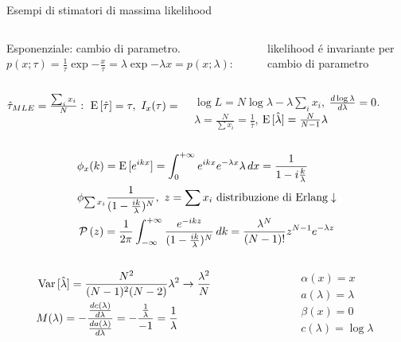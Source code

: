 \documentclass[asd-beamer.tex]{subfiles}
\begin{document}
\begin{frame}[allowframebreaks]{Esempi di stimatori di massima likelihood}
\begin{columns}[T]
\begin{column}{0.6\textwidth}
Esponenziale: cambio di parametro. $p(x;\tau)=\frac{1}{\tau}\exp{-\frac{x}{\tau}}=\lambda\exp{-\lambda x}=p(x;\lambda)$:
\end{column}
\begin{column}{0.4\textwidth}
likelihood \'e invariante per cambio di parametro
\end{column}
\end{columns}
\begin{columns}[b]
\begin{column}{0.4\textwidth}
$\hat{\tau}_{MLE}=\frac{\sum_ix_i}{N}:\ \E{[\hat{\tau}]}=\tau,\ I_x(\tau)=\frac{1}{\var{\hat{\tau}}},\ \var{\hat{\tau}}=\frac{\tau^2}{N}$
\end{column}
\begin{column}{0.6\textwidth}
$\log{L}=N\log{\lambda}-\lambda\sum_ix_i$, $\frac{d \log{\lambda}}{d \lambda}=0$. $\hat{\lambda}=\frac{N}{\sum x_i}=\frac{1}{\hat{\tau}}$, $\operatorname{E}{[\hat{\lambda}]}=\frac{N}{N-1}\lambda$
\end{column}
\end{columns}
\begin{align*}
&\phi_x(k)=\E{[\exp{ikx}]}=\intzi\exp{ikx}\exp{-\lambda x}\lambda\,dx=\frac{1}{1-i\frac{k}{\lambda}}\\
&\phi_{\sum x_i}\frac{1}{(1-\frac{ik}{\lambda})^N},\ z=\sum x_i\ \text{distribuzione di Erlang}\downarrow\\
&\prob{(z)}=\frac{1}{2\pi}\intsinf{}\frac{\exp{-ikz}}{(1-\frac{ik}{\lambda})^N}\,dk=\frac{\lambda^N}{(N-1)!}z^{N-1}\exp{-\lambda z}
\end{align*}
\begin{columns}[T]
\begin{column}{0.65\textwidth}
\begin{align*}
&\operatorname{Var}{[\hat{\lambda}]}=\frac{N^2}{(N-1)^2(N-2)}\lambda^2\to\frac{\lambda^2}{N}\\
&M(\lambda)=-\frac{\frac{d c(\lambda)}{d \lambda}}{\frac{d a(\lambda)}{d \lambda}}=-\frac{\frac{1}{\lambda}}{-1}=\frac{1}{\lambda}
\end{align*}
\end{column}
\begin{column}{0.35\textwidth}
\begin{align*}
&\alpha(x)=x\\
&a(\lambda)=\lambda\\
&\beta(x)=0\\
&c(\lambda)=\log{\lambda}
\end{align*}
\end{column}
\end{columns}


\end{frame}
\end{document}
